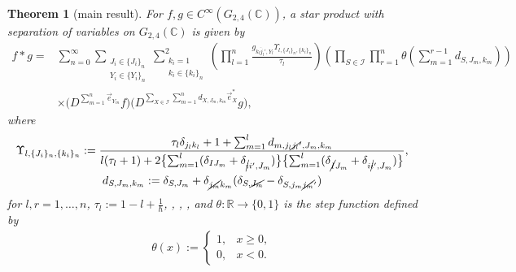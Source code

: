 \documentclass[10pt,a4paper]{amsart}
\numberwithin{equation}{section}
\newtheorem{Theorem}{Theorem}[section]
\begin{document}
\begin{Theorem}[main result]\label{thm_star_prd_G2_4}
For $f,g\in C^{\infty}(G_{2,4}(\mathbb{C}))$, a star product with separation of variables on $G_{2,4}(\mathbb{C})$ is given by
\begin{align}
 f \ast g
={}&
 \sum_{n=0}^{\infty}
 \sum_{
 \substack{
 J_{i}
 \in
\{
 J_{i}
\}_{n}\\
 Y_{i}
 \in
\{
 Y_{i}
\}_{n}
 }
 }
 \sum_{
 \substack{
 k_{i}=1\\
 k_{i}
 \in
\{
 k_{i}
\}_{n}
 }
 }^{2}
 \left(
 \prod_{l=1}^{n}
 \frac{
 g_{\overline{k_{l}j_{l}'},Y_{l}}
 \Upsilon_{
 l,
 \{
 J_{i}
 \}_{n},
 \{
 k_{i}
 \}_{n}
 }
 }{\tau_{l}}
 \right)
 \left(
 \prod_{
 S
 \in
 \mathcal{I}
 }
 \prod_{r=1}^{n}
 \theta
 \left(
 \sum_{m=1}^{r-1}
 d_{
 S,
 J_{m},
 k_{m}
 }
 \right)
 \right)
 \nonumber
 \\
 &
 \times
 \bigl(
 D^{
 \sum_{m=1}^{n}
 \vec{e}_{{Y_{m}}}
 }
 f
 \bigr)
 \bigl(
 D^{
 \sum_{
 X
 \in
 \mathcal{I}
 }
 \sum_{m=1}^{n}
 d_{
 X,
 J_{m},
 k_{m}
 }
 \vec{e}_{X}^{\ast}
 }
 g
 \bigr),
 \label{star_prd_G2_4}
\end{align}
where
\begin{gather*}
 \Upsilon_{
 l,
 \{
 J_{i}
 \}_{n},
 \{
 k_{i}
 \}_{n}
 }
 :=
 \frac{
 \tau_{l}
 \delta_{j_{l}k_{l}}
 +
 1
 +
 \sum_{m=1}^{l}
 d_{
 m,
 j_{l}\cancel{j_{l}}',
 J_{m},
 k_{m}
 }
 }{
 l
 (
 \tau_{l}+1
 )
 +
 2
 \bigl\{
 \sum_{m=1}^{l}
 (
 \delta_{IJ_{m}}
 +
 \delta_{\cancel{i}i',J_{m}}
 )
 \bigr\}
 \bigl\{
 \sum_{m=1}^{l}
 (
 \delta_{\cancel{I}J_{m}}
 +
 \delta_{i\cancel{i}',J_{m}}
 )
 \bigr\}
 },
 \\
 d_{
 S,
 J_{m},
 k_{m}
 }
 :=
 \delta_{
 S,
 J_{m}
 }
 +
 \delta_{\cancel{j_{m}}k_{m}}
 (
 \delta_{
 S,
 \cancel{J_{m}}
 }
 -
 \delta_{
 S,
 j_{m}\cancel{j_{m}}'
 }
 )
\end{gather*}
for $l,r=1,\dots,n$,
$
\tau_{l}
 :=
 1
 -
 l
 +
 \frac{1}{\hbar}
$,
,
,
,
and
$\theta\colon \mathbb{R}\to\{0,1\}$
is the step function defined by
\begin{align*}
 \theta(x)
 :=
 \begin{cases}
 1, & x\geq0,
 \\
 0, & x<0.
 \end{cases}
\end{align*}
\end{Theorem}
\end{document}

